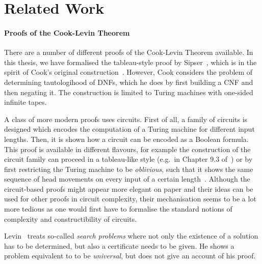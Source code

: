 \section{Related Work}
\paragraph{Proofs of the Cook-Levin Theorem}
There are a number of different proofs of the Cook-Levin Theorem available. In this thesis, we have formalised the tableau-style proof by Sipser~\cite[Chapter~7.4]{Sipser:TheoryofComputation}, which is in the spirit of Cook's original construction~\cite{cook_theorem}. However, Cook considers the problem of determining tautologihood of DNFs, which he does by first building a CNF and then negating it. The construction is limited to Turing machines with one-sided infinite tapes.

A class of more modern proofs uses circuits. First of all, a family of circuits is designed which encodes the computation of a Turing machine for different input lengths. Then, it is shown how a circuit can be encoded as a Boolean formula. This proof is available in different flavours, for example the construction of the circuit family can proceed in a tableau-like style (e.g.\ in Chapter 9.3 of~\cite{Sipser:TheoryofComputation}) or by first restricting the Turing machine to be \textit{oblivious}, such that it shows the same sequence of head movements on every input of a certain length~\cite[p.~199ff]{Bläser:TISkript}.
Although the circuit-based proofs might appear more elegant on paper and their ideas can be used for other proofs in circuit complexity, their mechanisation seems to be a lot more tedious as one would first have to formalise the standard notions of complexity and constructibility of circuits.

Levin~\cite{levin_theorem} treats so-called \textit{search problems} where not only the existence of a solution has to be determined, but also a certificate needs to be given. He shows a problem equivalent to \SAT{} to be \textit{universal}, but does not give an account of his proof.

